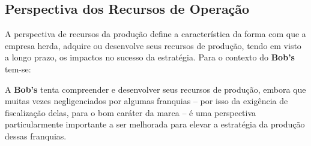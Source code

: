 		\subsection[Perspectiva dos Recursos de Operação]{Perspectiva dos Recursos de Operação}
		\label{sec:dados_perspOeste}

			A perspectiva de recursos da produção define a característica da forma com que a empresa herda, adquire ou desenvolve seus recursos de produção, tendo em visto a longo prazo, os impactos no sucesso da estratégia. Para o contexto do \textbf{Bob’s} tem-se:

			A \textbf{Bob’s} tenta compreender e desenvolver seus recursos de produção, embora que muitas vezes negligenciados por algumas franquias – por isso da exigência de fiscalização delas, para o bom caráter da marca – é uma perspectiva particularmente importante a ser melhorada para elevar a estratégia da produção dessas franquias. \cite{lamonica}